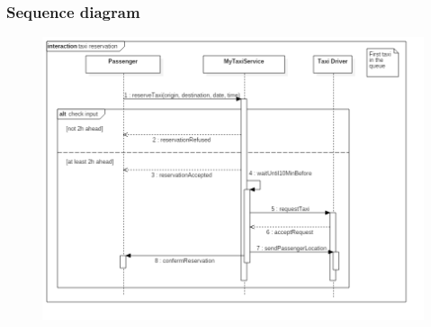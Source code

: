 \subsubsection{Sequence diagram}
\begin{figure}[H]
\centering
\includegraphics[scale=0.5]{Images/sequence_taxi_reservation}
\label{reserve_taxi_SD}
\end{figure}


